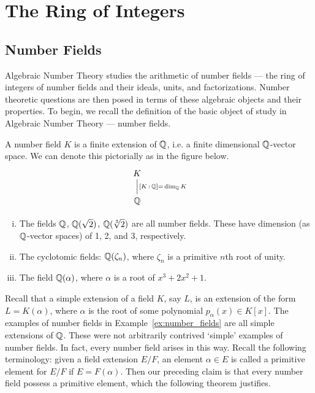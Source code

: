 \newpage
\section{The Ring of Integers}
\subsection{Number Fields}

Algebraic Number Theory studies the arithmetic of number fields --- the ring of integers of number fields and their ideals, units, and factorizations. Number theoretic questions are then posed in terms of these algebraic objects and their properties. To begin, we recall the definition of the basic object of study in Algebraic Number Theory --- number fields. 


\begin{dfn}
A number field $K$ is a finite extension of $\mathbb{Q}$, i.e. a finite dimensional $\mathbb{Q}$-vector space. We can denote this pictorially as in the figure below. 
	\[
	\begin{tikzcd}
	K \arrow[dash]{d}{[K\,:\,\Q]=\,\dim_\Q K} \\
	\Q
	\end{tikzcd}
	\]
\end{dfn}


\begin{ex} \label{ex:number_fields} \hfill
	\begin{enumerate}[(i)]
	\item The fields $\mathbb{Q}$, $\mathbb{Q}(\sqrt{2})$, $\mathbb{Q}(\sqrt[3]{2})$ are all number fields. These have dimension (as $\mathbb{Q}$-vector spaces) of 1, 2, and 3, respectively. 
	\item The cyclotomic fields: $\mathbb{Q}(\zeta_n)$, where $\zeta_n$ is a primitive $n$th root of unity.
	\item The field $\mathbb{Q}(\alpha)$, where $\alpha$ is a root of $x^3+2x^2+1$.
	\end{enumerate}
\end{ex}


Recall that a simple extension of a field $K$, say $L$, is an extension of the form $L= K(\alpha)$, where $\alpha$ is the root of some polynomial $p_\alpha(x) \in K[x]$. The examples of number fields in Example~\ref{ex:number_fields} are all simple extensions of $\mathbb{Q}$. These were not arbitrarily contrived `simple' examples of number fields. In fact, every number field arises in this way. Recall the following terminology: given a field extension $E/F$, an element $\alpha \in E$ is called a primitive element for $E/F$ if $E=F(\alpha)$. Then our preceding claim is that every number field possess a primitive element, which the following theorem justifies. 


